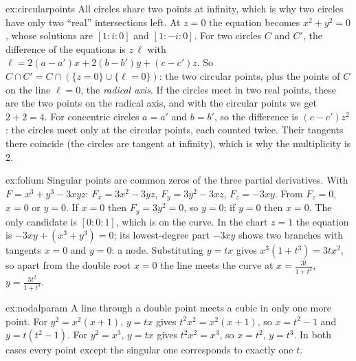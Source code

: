 \begin{solution}{ex:circularpoints}
\idea All circles share two points at infinity, which is why two circles have only two ``real'' intersections left.
\writeup At $z=0$ the equation becomes $x^2+y^2=0$, whose solutions are $[1:i:0]$ and $[1:-i:0]$. For two circles $C$ and $C'$, the difference of the equations is
$z\,\ell$ with $\ell=2(a-a')x+2(b-b')y+(c-c')z$. So $C\cap C'=C\cap(\{z=0\}\cup\{\ell=0\})$: the two circular points, plus the points of $C$ on the line $\ell=0$, the
\emph{radical axis}. If the circles meet in two real points, these are the two points on the radical axis, and with the circular points we get $2+2=4$. For
concentric circles $a=a'$ and $b=b'$, so the difference is $(c-c')z^2$: the circles meet only at the circular points, each counted twice. Their tangents there
coincide (the circles are tangent at infinity), which is why the multiplicity is $2$.
\end{solution}

\begin{solution}{ex:folium}
\idea Singular points are common zeros of the three partial derivatives.
\writeup With $F=x^3+y^3-3xyz$: $F_x=3x^2-3yz$, $F_y=3y^2-3xz$, $F_z=-3xy$. From $F_z=0$, $x=0$ or $y=0$. If $x=0$ then $F_y=3y^2=0$, so $y=0$; if $y=0$ then
$x=0$. The only candidate is $[0:0:1]$, which is on the curve. In the chart $z=1$ the equation is $-3xy+(x^3+y^3)=0$; its lowest-degree part $-3xy$ shows two
branches with tangents $x=0$ and $y=0$: a node. Substituting $y=tx$ gives $x^3(1+t^3)=3tx^2$, so apart from the double root $x=0$ the line meets the curve at
$x=\frac{3t}{1+t^3}$, $y=\frac{3t^2}{1+t^3}$.
\end{solution}

\begin{solution}{ex:nodalparam}
\idea A line through a double point meets a cubic in only one more point.
\writeup For $y^2=x^2(x+1)$, $y=tx$ gives $t^2x^2=x^2(x+1)$, so $x=t^2-1$ and $y=t(t^2-1)$. For $y^2=x^3$, $y=tx$ gives $t^2x^2=x^3$, so $x=t^2$, $y=t^3$. In both cases
every point except the singular one corresponds to exactly one $t$.
\end{solution}

